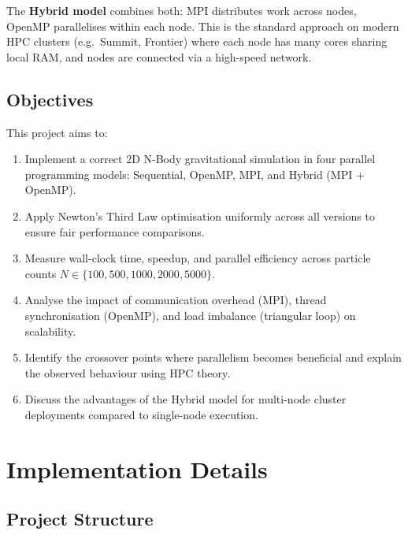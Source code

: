 ﻿\documentclass[12pt,a4paper]{article}
\begin{document}
The \textbf{Hybrid model} combines both: MPI distributes work across nodes,
OpenMP parallelises within each node. This is the standard approach on
modern HPC clusters (e.g.\ Summit, Frontier) where each node has many cores
sharing local RAM, and nodes are connected via a high-speed network.

\subsection{Objectives}

This project aims to:

\begin{enumerate}
    \item Implement a correct 2D N-Body gravitational simulation in four
          parallel programming models: Sequential, OpenMP, MPI, and Hybrid
          (MPI + OpenMP).
    \item Apply Newton's Third Law optimisation uniformly across all versions
          to ensure fair performance comparisons.
    \item Measure wall-clock time, speedup, and parallel efficiency across
          particle counts $N \in \{100, 500, 1000, 2000, 5000\}$.
    \item Analyse the impact of communication overhead (MPI), thread
          synchronisation (OpenMP), and load imbalance (triangular loop)
          on scalability.
    \item Identify the crossover points where parallelism becomes beneficial
          and explain the observed behaviour using HPC theory.
    \item Discuss the advantages of the Hybrid model for multi-node cluster
          deployments compared to single-node execution.
\end{enumerate}

\section{Implementation Details}

\subsection{Project Structure}
\end{document}
